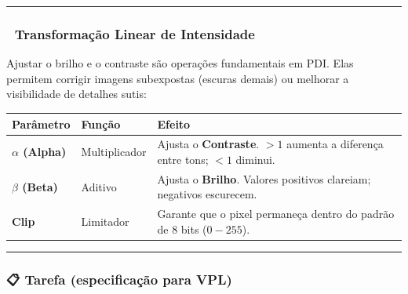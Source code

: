 \documentclass[
  portuguese,
  letterpaper,
  openany,
  oneside,
  12pt,
  a4paper]{book}
\begin{document}
\begin{center}\rule{0.5\linewidth}{0.5pt}\end{center}

\subsubsection{🧠 Transformação Linear de
Intensidade}\label{transformauxe7uxe3o-linear-de-intensidade}

Ajustar o brilho e o contraste são operações fundamentais em PDI. Elas
permitem corrigir imagens subexpostas (escuras demais) ou melhorar a
visibilidade de detalhes sutis:

\begin{longtable}[]{@{}
  >{\raggedright\arraybackslash}p{}
  >{\raggedright\arraybackslash}p{}
  >{\raggedright\arraybackslash}p{}@{}}
\toprule\noalign{}
\begin{minipage}[b]{\linewidth}\raggedright
Parâmetro
\end{minipage} & \begin{minipage}[b]{\linewidth}\raggedright
Função
\end{minipage} & \begin{minipage}[b]{\linewidth}\raggedright
Efeito
\end{minipage} \\
\midrule\noalign{}
\endhead
\bottomrule\noalign{}
\endlastfoot
\textbf{\(\alpha\) (Alpha)} & Multiplicador & Ajusta o
\textbf{Contraste}. \(>1\) aumenta a diferença entre tons; \(<1\)
diminui. \\
\textbf{\(\beta\) (Beta)} & Aditivo & Ajusta o \textbf{Brilho}. Valores
positivos clareiam; negativos escurecem. \\
\textbf{Clip} & Limitador & Garante que o pixel permaneça dentro do
padrão de 8 bits (\(0-255\)). \\
\end{longtable}

\begin{center}\rule{0.5\linewidth}{0.5pt}\end{center}

\subsubsection{📋 Tarefa (especificação para
VPL)}\label{tarefa-especificauxe7uxe3o-para-vpl-5}
\end{document}
